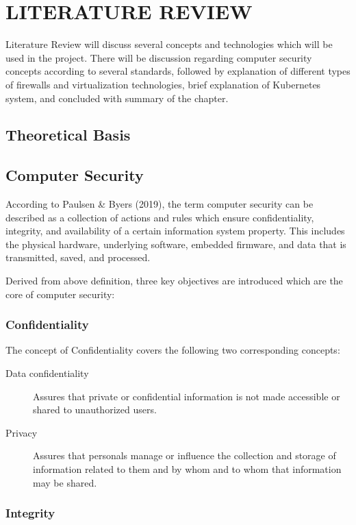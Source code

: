 \documentclass[../index.tex]{subfiles}
\begin{document}
\chapter{LITERATURE REVIEW}

Literature Review will discuss several concepts and technologies which will be used in the project.
There will be discussion regarding computer security concepts according to several standards,
followed by explanation of different types of firewalls and virtualization technologies, brief
explanation of Kubernetes system, and concluded with summary of the chapter.

\section{Theoretical Basis}

\section{Computer Security}

According to Paulsen \& Byers (2019), the term computer security can be described as a collection of
actions and rules which ensure confidentiality, integrity, and availability of a certain information
system property. This includes the physical hardware, underlying software, embedded firmware, and
data that is transmitted, saved, and processed.

Derived from above definition, three key objectives are introduced which are the core of computer
security:

\subsection{Confidentiality}

The concept of Confidentiality covers the following two corresponding concepts:

\begin{description}
	\item[Data confidentiality] Assures that private or confidential information is not made
		accessible or shared to unauthorized users.
	\item[Privacy] Assures that personals manage or influence the collection and storage of
		information related to them and by whom and to whom that information may be shared.
\end{description}

\subsection{Integrity}
\end{document}
